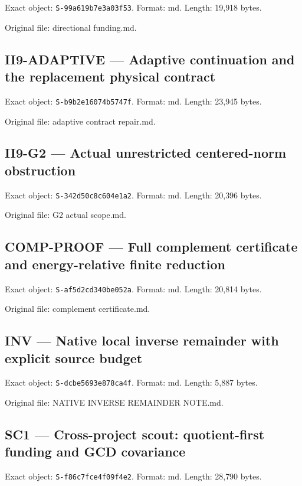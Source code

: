 \documentclass[
  10pt,
  a4paper,
  10pt,
  oneside,
  openany]{book}
\begin{document}
Exact object: \texttt{S-99a619b7e3a03f53}. Format: md. Length: 19,918
bytes.

Original file: directional funding.md.

\subsection{II9-ADAPTIVE --- Adaptive continuation and the replacement
physical contract}\label{source-ii9-adaptive}

Exact object: \texttt{S-b9b2e16074b5747f}. Format: md. Length: 23,945
bytes.

Original file: adaptive contract repair.md.

\subsection{II9-G2 --- Actual unrestricted centered-norm
obstruction}\label{source-ii9-g2}

Exact object: \texttt{S-342d50c8c604e1a2}. Format: md. Length: 20,396
bytes.

Original file: G2 actual scope.md.

\subsection{COMP-PROOF --- Full complement certificate and
energy-relative finite reduction}\label{source-comp-proof}

Exact object: \texttt{S-af5d2cd340be052a}. Format: md. Length: 20,814
bytes.

Original file: complement certificate.md.

\subsection{INV --- Native local inverse remainder with explicit source
budget}\label{source-inv}

Exact object: \texttt{S-dcbe5693e878ca4f}. Format: md. Length: 5,887
bytes.

Original file: NATIVE INVERSE REMAINDER NOTE.md.

\subsection{SC1 --- Cross-project scout: quotient-first funding and GCD
covariance}\label{source-sc1}

Exact object: \texttt{S-f86c7fce4f09f4e2}. Format: md. Length: 28,790
bytes.
\end{document}
